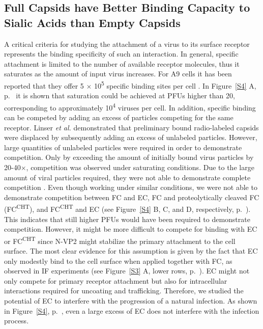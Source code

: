 \subsection{Full Capsids have Better Binding Capacity to Sialic Acids than Empty Capsids}

A critical criteria for studying the attachment of a virus to its surface receptor represents the binding specificity of such an interaction. In general, specific attachment is limited to the number of available receptor molecules, thus it saturates as the amount of input virus increases. For A9 cells it has been reported that they offer 5 $\times$ 10\textsuperscript{5} specific binding sites per cell \cite{pmid20517}. In Figure~\ref{S4} A, p.~\pageref{S4} it is shown that saturation could be achieved at PFUs higher than 20, corresponding to approximately 10\textsuperscript{4} viruses per cell. In addition, specific binding can be competed by adding an excess of particles competing for the same receptor. Linser \textit{et al.} demonstrated that preliminary bound radio-labeled capsids were displaced by subsequently adding an excess of unlabeled particles. However, large quantities of unlabeled particles were required in order to demonstrate competition. Only by exceeding the amount of initially bound virus particles by 20-40$\times$, competition was observed under saturating conditions. Due to the large amount of viral particles required, they were not able to demonstrate complete competition \cite{pmid20517}. Even though working under similar conditions, we were not able to demonstrate competition between FC and EC, FC and proteolytically cleaved FC (FC\textsuperscript{CHT}), and FC\textsuperscript{CHT} and EC (see Figure~\ref{S4} B, C, and D, respectively, p.~\pageref{S4}). This indicates that still higher PFUs would have been required to demonstrate competition. However, it might be more difficult to compete for binding with EC or FC\textsuperscript{CHT} since N-VP2 might stabilize the primary attachment to the cell surface. The most clear evidence for this assumption is given by the fact that EC only modestly bind to the cell surface when applied together with FC, as observed in IF experiments (see Figure~\ref{S3} A, lower rows, p.~\pageref{S3}). EC might not only compete for primary receptor attachment but also for intracellular interactions required for uncoating and trafficking. Therefore, we studied the potential of EC to interfere with the progression of a natural infection. As shown in Figure~\ref{S4}, p.~\pageref{S4}, even a large excess of EC does not interfere with the infection process. 

